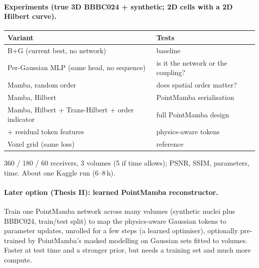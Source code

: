 \documentclass[10pt,a4paper]{article}
\begin{document}
\paragraph{Experiments (true 3D BBBC024 + synthetic; 2D cells with a 2D Hilbert curve).}
\begin{center}
\begin{tabular}{ll}
\toprule
Variant & Tests \\
\midrule
B+G (current best, no network) & baseline \\
Per-Gaussian MLP (same head, no sequence) & is it the network or the coupling? \\
Mamba, random order & does spatial order matter? \\
Mamba, Hilbert & PointMamba serialisation \\
Mamba, Hilbert + Trans-Hilbert + order indicator & full PointMamba design \\
\quad + residual token features & physics-aware tokens \\
Voxel grid (same loss) & reference \\
\bottomrule
\end{tabular}
\end{center}
360 / 180 / 60 receivers, 3 volumes (5 if time allows); PSNR, SSIM, parameters, time. About one Kaggle run (6--8\,h).

\paragraph{Later option (Thesis II): learned PointMamba reconstructor.}\label{sec:learned}
Train one PointMamba network across many volumes (synthetic nuclei plus BBBC024, train/test split) to map the
physics-aware Gaussian tokens to parameter updates, unrolled for a few steps (a learned optimiser), optionally
pre-trained by PointMamba's masked modelling on Gaussian sets fitted to volumes. Faster at test time and a stronger
prior, but needs a training set and much more compute.
\end{document}
